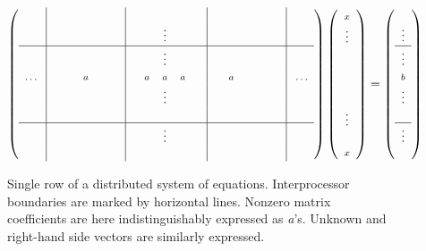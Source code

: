 \begin{figure}
\begin{center}
\newcommand{\qq}{\scriptstyle}
\renewcommand{\arraycolsep}{4 pt}
\renewcommand{\arraystretch}{0.5}
\begin{equation}
\left(
\begin{array}{ c|c c c c c|c c c c c|c c c c c|c }
 & & & & & & & &\qq \; & & & & & & & & \\
 & & & & & & & &\qq \vdots & & & & & & & & \\
\hline
 & & & & & & & &\qq \vdots & & & & & & & & \\
\qq .\,.\,.\; &\qq \; &\qq \; &\qq a &\qq \; &\qq \; &
\qq \! & \qq a &\qq a &\qq a &\qq \; &
\qq \; &\qq a &\qq \; &\qq \; &\qq \; &\qq \; .\,.\,.\\
 & & & & & & & &\qq \vdots & & & & & & & & \\
 & & & & & & & &\qq \; & & & & & & & & \\
\hline
 & & & & & & & &\qq \vdots & & & & & & & \\
 & & & & & & & &\qq \; & & & & & & & & \\
\end{array}
\right)
\left(
\begin{array}{c}
\qq x \\
\qq \vdots \\
\\
\\
\\
\\
\qq \vdots \\
\\
\qq x \\
\end{array}
\right)
=
\left(
\begin{array}{c}
\qq \;\\
\qq \vdots \\
\hline
\qq \vdots \\
\qq b \\
\qq \vdots \\
\qq \;\\
\hline
\qq \vdots \\
\qq \; \\
\end{array}
\right)
\end{equation}
\caption{Single row of a distributed system of equations.
Interprocessor boundaries are marked by horizontal lines.
Nonzero matrix coefficients are here indistinguishably
expressed as {\it a}'s.  Unknown and right-hand side
vectors are similarly expressed.}
\end{center}
\end{figure}

